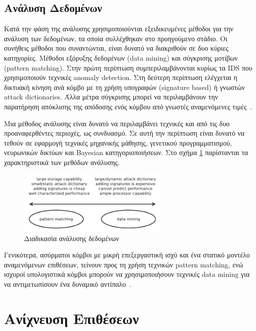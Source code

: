 \documentclass[12pt]{report}
\begin{document}
\subsection{Ανάλυση Δεδομένων}
Κατά την φάση της ανάλυσης χρησιμοποιούνται εξειδικευμένες μέθοδοι για την ανάλυση των δεδομένων, τα οποία συλλέχθηκαν στο προηγούμενο στάδιο. Οι συνήθεις μέθοδοι που συναντώνται, είναι δυνατό να διακριθούν σε δυο κύριες κατηγορίες. Μέθοδοι εξόρυξης δεδομένων (\textlatin{data mining}) και σύγκρισης μοτίβων (\textlatin{pattern matching}). Στην πρώτη περίπτωση συμπεριλαμβάνονται κυρίως τα \textlatin{IDS} που χρησιμοποιούν τεχνικές \textlatin{anomaly detection}. Στη δεύτερη περίπτωση ελέγχεται η δικτυακή κίνηση ανά κόμβο με τη χρήση υπογραφών (\textlatin{signature based}) ή γνωστών \textlatin{attack dictionaries}. Άλλα μέτρα σύγκρισης μπορεί να περιλαμβάνουν την παρατήρηση απόκλισης της απόδοσης ενός κόμβου από γνωστές αναμενόμενες τιμές~\cite{paper:12}.

Μια μέθοδος ανάλυσης είναι δυνατό να περιλαμβάνει τεχνικές και από τις δυο προαναφερθέντες περιοχές, ως συνδυασμό. Σε αυτή την περίπτωση είναι δυνατό να τεθούν σε εφαρμογή τεχνικές μηχανικής μάθησης, γενετικού προγραμματισμού, νευρωνικών δικτύων και \textlatin{Bayesian} κατηγοριοποιήσεων. Στο σχήμα \ref{fig:anal-appr} παρίστανται τα χαρακτηριστικά των μεθόδων ανάλυσης.
\begin{figure}[ht]
\centering
\includegraphics[width=0.65\textwidth]{anal-appr}
\caption{Διαδικασία ανάλυσης δεδομένων}
\label{fig:anal-appr}
\end{figure}

Γενικότερα, ασύρματοι κόμβοι με μικρή επεξεργαστική ισχύ και ένα στατικό μοντέλο αναμενόμενων επιθέσεων, τείνουν προς τη χρήση τεχνικών \textlatin{pattern matching}, ενώ ισχυροί υπολογιστικά κόμβοι μπορούν να χρησιμοποιήσουν τεχνικές \textlatin{data mining} για να αντιμετωπίσουν ένα δυναμικό αντίπαλο~\cite{paper:12}.

\section{Ανίχνευση Επιθέσεων}
\end{document}
